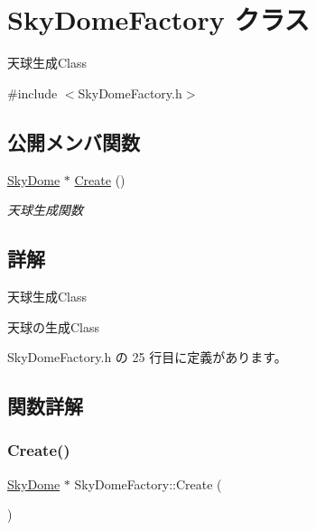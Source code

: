 \hypertarget{class_sky_dome_factory}{}\section{Sky\+Dome\+Factory クラス}
\label{class_sky_dome_factory}


天球生成\+Class  




{\ttfamily \#include $<$Sky\+Dome\+Factory.\+h$>$}

\subsection*{公開メンバ関数}
\begin{DoxyCompactItemize}
\item 
\mbox{\hyperlink{class_sky_dome}{Sky\+Dome}} $\ast$ \mbox{\hyperlink{class_sky_dome_factory_a3c81f3070b792d84ebcfdfe13334c6f8}{Create}} ()
\begin{DoxyCompactList}\small\item\em 天球生成関数 \end{DoxyCompactList}\end{DoxyCompactItemize}


\subsection{詳解}
天球生成\+Class 

天球の生成\+Class 

 Sky\+Dome\+Factory.\+h の 25 行目に定義があります。



\subsection{関数詳解}
\mbox{\label{class_sky_dome_factory_a3c81f3070b792d84ebcfdfe13334c6f8}} 
\subsubsection{\texorpdfstring{Create()}{Create()}}
{\footnotesize\ttfamily \mbox{\hyperlink{class_sky_dome}{Sky\+Dome}} $\ast$ Sky\+Dome\+Factory\+::\+Create (\begin{DoxyParamCaption}{ }\end{DoxyParamCaption})}



